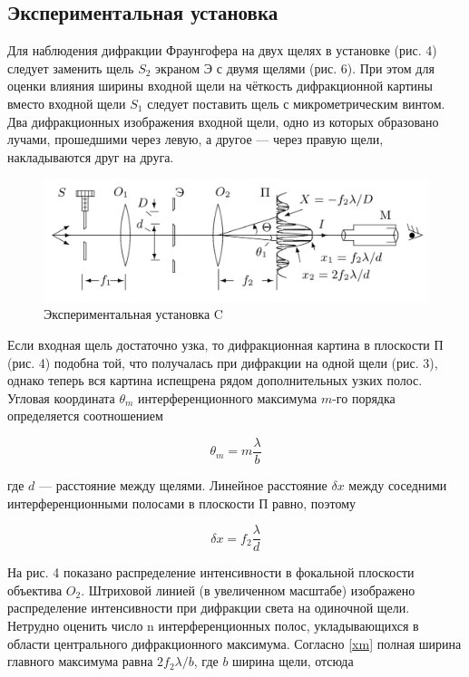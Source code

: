 \documentclass[a4paper, 12pt]{article}
\begin{document}
\subsection{Экспериментальная установка}

Для наблюдения дифракции Фраунгофера на двух щелях в установке (рис. 4) следует заменить щель $ S_2 $ экраном Э с двумя щелями
(рис. 6). При этом для оценки влияния ширины входной щели на чёткость дифракционной картины вместо входной щели $ S_1 $ следует поставить щель с микрометрическим винтом. Два дифракционных изображения входной щели, одно из которых образовано лучами, прошедшими через левую, а другое --- через правую щели, накладываются друг на друга.

	\begin{figure}[h!]
		\centering
		\includegraphics[width=0.8\linewidth]{c.png}
		\caption{Экспериментальная установка C}
		\label{labC}
	\end{figure}

Если входная щель достаточно узка, то дифракционная картина
в плоскости П (рис. 4) подобна той, что получалась при дифракции
на одной щели (рис. 3), однако теперь вся картина испещрена рядом
дополнительных узких полос.
Угловая координата $ \theta_m $ интерференционного максимума $ m $-го порядка определяется соотношением

\begin{equation}\label{}
\theta_m = m \dfrac{\lambda}{b}
\end{equation}

где $ d $ --- расстояние между щелями. Линейное расстояние $ \delta x $ между соседними интерференционными полосами в плоскости П равно, поэтому

\begin{equation}\label{dx}
\delta x = f_2 \dfrac{\lambda}{d}
\end{equation}

На рис. 4 показано распределение интенсивности в фокальной плоскости объектива $ O_2 $. Штриховой линией (в увеличенном масштабе)
изображено распределение интенсивности при дифракции света на одиночной щели. Нетрудно оценить число n интерференционных полос,
укладывающихся в области центрального дифракционного максимума.
Согласно \eqref{xm} полная ширина главного максимума равна $ 2 f_2 \lambda /b $, где $ b $ ширина щели, отсюда
\end{document}
